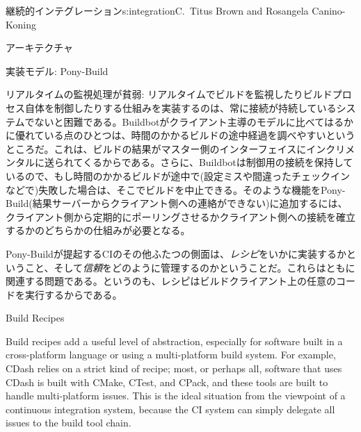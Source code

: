 \begin{aosachapter}{継続的インテグレーション}{s:integration}{C.\ Titus Brown and Rosangela Canino-Koning}
\begin{aosasect1}{アーキテクチャ}
\begin{aosasect2}{実装モデル: Pony-Build}
\begin{aosadescription}
  \item{リアルタイムの監視処理が貧弱:} リアルタイムでビルドを監視したりビルドプロセス自体を制御したりする仕組みを実装するのは、常に接続が持続しているシステムでないと困難である。Buildbotがクライアント主導のモデルに比べてはるかに優れている点のひとつは、時間のかかるビルドの途中経過を調べやすいというところだ。これは、ビルドの結果がマスター側のインターフェイスにインクリメンタルに送られてくるからである。さらに、Buildbotは制御用の接続を保持しているので、もし時間のかかるビルドが途中で(設定ミスや間違ったチェックインなどで)失敗した場合は、そこでビルドを中止できる。そのような機能をPony-Build(結果サーバーからクライアント側への連絡ができない)に追加するには、クライアント側から定期的にポーリングさせるかクライアント側への接続を確立するかのどちらかの仕組みが必要となる。

\end{aosadescription}

Pony-Buildが提起するCIのその他ふたつの側面は、\emph{レシピ}をいかに実装するかということ、そして\emph{信頼}をどのように管理するのかということだ。これらはともに関連する問題である。というのも、レシピはビルドクライアント上の任意のコードを実行するからである。

\end{aosasect2}

\begin{aosasect2}{Build Recipes}

Build recipes add a useful level of abstraction, especially for
software built in a cross-platform language or using a multi-platform
build system. For example, CDash relies on a strict kind of
recipe; most, or perhaps all, software that uses CDash is built
with CMake, CTest, and CPack, and these tools are built to handle
multi-platform issues. This is the ideal situation from the viewpoint
of a continuous integration system, because the CI system can simply
delegate all issues to the build tool chain.


\end{aosasect2}
\end{aosasect1}
\end{aosachapter}
